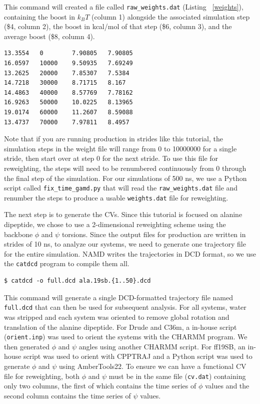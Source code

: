 \documentclass[9pt,tutorial]{livecoms}
\begin{document}
This command will created a file called \texttt{raw\_weights.dat} (Listing ~\ref{weights}), containing the boost in $k_{B}T$ (column 1) alongside the associated simulation step (\$4, column 2), the boost in kcal/mol of that step (\$6, column 3), and the average boost (\$8, column 4). 


\begin{lstlisting}[label=weights, caption=raw\_weights.dat, basicstyle=\small, backgroundcolor=\color{light-gray}]
13.3554   0 	   7.90805 	 7.90805
16.0597   10000    9.50935 	 7.69249
13.2625	  20000    7.85307 	 7.5384
14.7218   30000    8.71715 	 8.167
14.4863   40000    8.57769 	 7.78162
16.9263   50000    10.0225 	 8.13965
19.0174   60000    11.2607 	 8.59088
13.4737   70000    7.97811 	 8.4957
\end{lstlisting}

Note that if you are running production in strides like this tutorial, the simulation steps in the weight file will range from 0 to 10000000 for a single stride, then start over at step 0 for the next stride. To use this file for reweighting, the steps will need to be renumbered continuously from 0 through the final step of the simulation. For our simulations of 500 ns, we use a Python script called \texttt{fix\_time\_gamd.py} that will read the \texttt{raw\_weights.dat} file and renumber the steps to produce a usable \texttt{weights.dat} file for reweighting. 

The next step is to generate the CVs. Since this tutorial is focused on alanine dipeptide, we chose to use a 2-dimensional reweighting scheme using the backbone $\phi$ and $\psi$ torsions. Since the output files for production are written in strides of 10 ns, to analyze our systems, we need to generate one trajectory file for the entire simulation. NAMD writes the trajectories in DCD format, so we use the \texttt{catdcd} program to compile them all.

\begin{lstlisting}[style=MyBash]
$ catdcd -o full.dcd ala.19sb.{1..50}.dcd
\end{lstlisting}

This command will generate a single DCD-formatted trajectory file named \texttt{full.dcd} that can then be used for subsequent analysis. For all systems, water was stripped and each system was oriented to remove global rotation and translation of the alanine dipeptide. For Drude and C36m, a in-house script (\texttt{orient.inp}) was used to orient the systems with the CHARMM program. We then generated $\phi$ and $\psi$ angles using another CHARMM script. For ff19SB, an in-house script was used to orient with CPPTRAJ and a Python script was used to generate $\phi$ and $\psi$ using AmberTools22. To ensure we can have a functional CV file for reweighting, both $\phi$ and $\psi$ must be in the same file (\texttt{cv.dat}) containing only two columns, the first of which contains the time series of $\phi$ values and the second column contains the time series of $\psi$ values.
\end{document}
